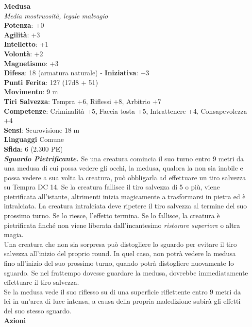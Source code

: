 \begin{multicols}{2}
\medskip\textbf{Medusa}\\
\emph{Media mostruosità, legale malvagio}\\
\textbf{Potenza}: +0\\
\textbf{Agilità}: +3\\
\textbf{Intelletto}: +1\\
\textbf{Volontà}: +2\\
\textbf{Magnetismo}: +3\\
\textbf{Difesa}: 18 (armatura naturale) - \textbf{Iniziativa}: +3\\
\textbf{Punti Ferita}: 127 (17d8 + 51)\\
\textbf{Movimento}: 9 m\\
\textbf{Tiri Salvezza}: Tempra +6, Riflessi +8, Arbitrio +7\\
\textbf{Competenze}: Criminalità +5, Faccia tosta +5, Intrattenere +4, Consapevolezza +4\\
\textbf{Sensi}: Scurovisione 18 m\\
\textbf{Linguaggi} Comune\\
\textbf{Sfida}: 6 (2.300 PE)\smallskip\\
\emph{\textbf{Sguardo Pietrificante.}} Se una creatura comincia il suo turno entro 9 metri da una medusa di cui possa vedere gli occhi, la medusa, qualora la non sia inabile e possa vedere a sua volta la creatura, può obbligarla ad effettuare un tiro salvezza su Tempra DC 14. Se la creatura fallisce il tiro salvezza di 5 o più, viene pietrificata all'istante, altrimenti inizia magicamente a trasformarsi in pietra ed è intralciata. La creatura intralciata deve ripetere il tiro salvezza al termine del suo prossimo turno. Se lo riesce, l'effetto termina. Se lo fallisce, la creatura è pietrificata finché non viene liberata dall'incantesimo \emph{ristorare superiore} o altra magia.\\
Una creatura che non sia sorpresa può distogliere lo sguardo per evitare il tiro salvezza all'inizio del proprio round. In quel caso, non potrà vedere la medusa fino all'inizio del suo prossimo turno, quando potrà distogliere nuovamente lo sguardo. Se nel frattempo dovesse guardare la medusa, dovrebbe immediatamente effettuare il tiro salvezza.\\
Se la medusa vede il suo riflesso su di una superficie riflettente entro 9 metri da lei in un'area di luce intensa, a causa della propria maledizione subirà gli effetti del suo stesso sguardo.\\

\smallskip\textbf{Azioni}\\


\end{multicols}

